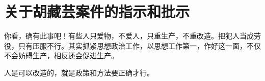 \section[关于胡藏芸案件的指示和批示（一九六四年四月）]{关于胡藏芸案件的指示和批示}


你看，确有此事吧！有些人只爱物，不爱人，只重生产，不重改造。把犯人当成劳役，只有压服不行。其实抓紧思想政治工作，以思想工作第一，作好这一面，不仅不会妨碍生产，相反还会促进生产。


人是可以改造的，就是政策和方法要正确才行。

